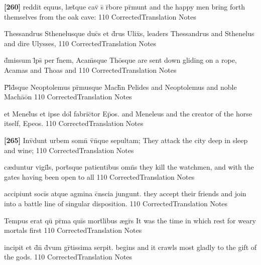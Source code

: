 \latline
  {\textbf{[260]} reddit equus, l{\ae}t\={\macron {\i}}que cav\={} s\={} r\={}bore pr\={}munt}
  { and the happy men bring forth themselves from the oak cave: }
  {110}
  { CorrectedTranslation }
  { Notes }


\latline
  {Thessandrus Sthenelusque duc\={}s et d\={\macron {\i}}rus Ulix\={}s,}
  { leaders Thessandrus and Sthenelus and dire Ulysses, }
  {110}
  { CorrectedTranslation }
  { Notes }


\latline
  {d\={}missum l\={}ps\={\macron {\i}} per f\={}nem, Acam\={}sque Tho\={}sque}
  { are sent down gliding on a rope, Acamas and Thoas and  }
  {110}
  { CorrectedTranslation }
  { Notes }


\latline
  {P\={}l\={\macron {\i}}d\={}sque Neoptolemus pr\={\macron {\i}}musque Mach\={}\={}n}
  { Pelides and Neoptolemus and noble Mach\={a}\={o}n }
  {110}
  { CorrectedTranslation }
  { Notes }


\latline
  {et Menel\={}us et ipse dol\={\macron {\i}} fabric\={}tor Ep\={}os.}
  { and Meneleus and the creator of the horse itself, Epeos. }
  {110}
  { CorrectedTranslation }
  { Notes }


\latline
  {\textbf{[265]} Inv\={}dunt urbem somn\={} v\={\macron {\i}}n\={}que sepultam;}
  { They attack the city deep in sleep and wine;  }
  {110}
  { CorrectedTranslation }
  { Notes }


\latline
  {c{\ae}duntur vigil\={}s, port\={\macron {\i}}sque patientibus omn\={\macron {\i}}s}
  { they kill the watchmen, and with the gates having been open to all }
  {110}
  { CorrectedTranslation }
  { Notes }


\latline
  {accipiunt soci\={}s atque agmina c\={}nscia jungunt.}
  { they accept their friends and join into a battle line of singular disposition. }
  {110}
  { CorrectedTranslation }
  { Notes }


\latline
  {Tempus erat qu\={} pr\={\macron {\i}}ma qui\={}s mort\={}libus {\ae}gr\={\macron {\i}}s}
  { It was the time in which rest for weary mortals first  }
  {110}
  { CorrectedTranslation }
  { Notes }


\latline
  {incipit et d\={}n\={} d\={\macron {\i}}vum gr\={}tissima serpit.}
  { begins and it crawls most gladly to the gift of the gods. }
  {110}
  { CorrectedTranslation }
  { Notes }


